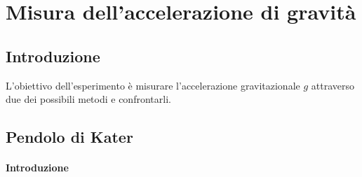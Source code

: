 \chapter{Misura dell'accelerazione di gravità}
\section{Introduzione}
L'obiettivo dell'esperimento è misurare l'accelerazione gravitazionale $g$ attraverso due dei possibili metodi e confrontarli. 

\section{Pendolo di Kater}
\subsubsection{Introduzione}
